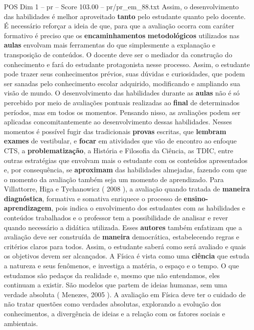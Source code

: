 \begin{textsample}{POS Dim 1 – pr – Score 103.00 – pr/pr\_em\_88.txt}
Assim, o desenvolvimento das habilidades é melhor aproveitado \textbf{tanto} pelo estudante quanto pelo docente.
É necessário reforçar a ideia de que, para que a avaliação ocorra com caráter formativo é preciso que os \textbf{encaminhamentos} \textbf{metodológicos} utilizados nas \textbf{aulas} envolvam mais ferramentas do que simplesmente a explanação e transposição de conteúdos.
O docente deve ser o mediador da construção do conhecimento e fará do estudante protagonista nesse processo.
Assim, o estudante pode trazer seus conhecimentos prévios, suas dúvidas e curiosidades, que podem ser sanadas pelo conhecimento escolar adquirido, modificando e ampliando sua visão de mundo.
O desenvolvimento das habilidades durante as \textbf{aulas} não é só percebido por meio de avaliações pontuais realizadas ao \textbf{final} de determinados períodos, mas em todos os momentos.
Pensando nisso, as avaliações podem ser aplicadas concomitantemente ao desenvolvimento dessas habilidades.
Nesses momentos é possível fugir das tradicionais \textbf{provas} escritas, que \textbf{lembram} \textbf{exames} de vestibular, e \textbf{focar} em atividades que vão de encontro ao enfoque CTS, a \textbf{problematização}, a História e Filosofia da Ciência, as TDIC, entre outras estratégias que envolvam mais o estudante com os conteúdos apresentados e, por consequência, se \textbf{aproximam} das habilidades almejadas, fazendo com que o momento da avaliação também seja um momento de aprendizado.
Para Villattorre, Higa e Tychanowicz ( 2008 ), a avaliação quando tratada de \textbf{maneira} \textbf{diagnóstica}, formativa e somativa enriquece o processo de \textbf{ensino-aprendizagem}, pois indica o envolvimento dos estudantes com as habilidades e conteúdos trabalhados e o professor tem a possibilidade de analisar e rever quando necessário a didática utilizada.
Esses \textbf{autores} também enfatizam que a avaliação deve ser construída de \textbf{maneira} democrática, estabelecendo regras e critérios claros para todos.
Assim, o estudante saberá como será avaliado e quais os objetivos devem ser alcançados.
A Física é vista como uma \textbf{ciência} que estuda a natureza e seus fenômenos, e investiga a matéria, o espaço e o tempo.
O que estudamos são pedaços da realidade e, mesmo que não entendamos, eles continuam a existir.
São modelos que partem de ideias humanas, sem uma verdade absoluta ( Menezes, 2005 ).
A avaliação em Física deve ter o cuidado de não tratar questões como verdades absolutas, explorando a evolução dos conhecimentos, a divergência de ideias e a relação com os fatores sociais e ambientais.

\end{textsample}
